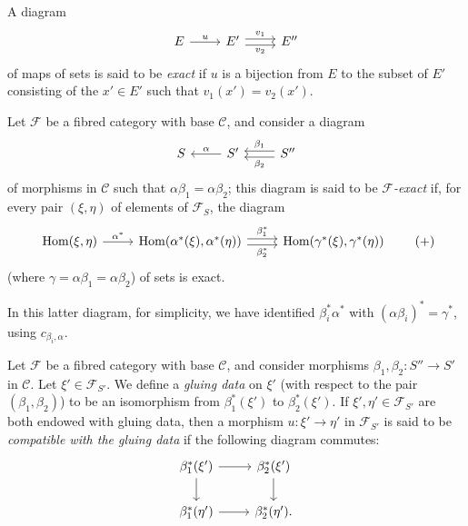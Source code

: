 \documentclass{article}
\theoremstyle{plain}
\theoremstyle{definition}
\newenvironment{definition}[1]
  {\renewcommand\theinnercustomdefinition{#1}\innercustomdefinition}
  {\endinnercustomdefinition}
\newcommand{\sh}[1]{{\mathscr{#1}}}
\newcommand{\cat}[1]{{\mathcal{#1}}}
\DeclareMathOperator{\Hom}{Hom}
\begin{document}
\subsubsection{}
\label{A.1.b}

\begin{definition}{1.2}
\label{definition:A.1.2}
  A diagram
  \[
    \begin{tikzcd}
      E \rar["u"]
      & E' \rar[shift left=1,"v_1"] \rar[shift right=1,swap,"v_2"]
      & E''
    \end{tikzcd}
  \]
  of maps of sets is said to be \emph{exact} if $u$ is a bijection from $E$ to the subset of $E'$ consisting of the $x'\in E'$ such that $v_1(x')=v_2(x')$.
\end{definition}

\begin{definition}{1.3}
\label{definition:A.1.3}
  Let $\sh{F}$ be a fibred category with base $\cat{C}$, and consider a diagram
  \[
    \begin{tikzcd}
      S
      & S' \lar[swap,"\alpha"]
      & S'' \lar[shift right=1,swap,"\beta_1"] \lar[shift left=1,"\beta_2"]
    \end{tikzcd}
  \]
  of morphisms in $\cat{C}$ such that $\alpha\beta_1=\alpha\beta_2$;
  this diagram is said to be \emph{$\sh{F}$-exact} if, for every pair $(\xi,\eta)$ of elements of $\sh{F}_S$, the diagram
  \[
  \label{equation-definition:A.1.3}
    \begin{tikzcd}
      \Hom(\xi,\eta) \rar["\alpha^*"]
      & \Hom(\alpha^*(\xi),\alpha^*(\eta)) \rar[shift left=1,"\beta_1^*"] \rar[shift right=1,swap,"\beta_2^*"]
      & \Hom(\gamma^*(\xi),\gamma^*(\eta))
    \end{tikzcd}
  \tag{+}
  \]
  (where $\gamma=\alpha\beta_1=\alpha\beta_2$) of sets is exact.

  In this latter diagram, for simplicity, we have identified $\beta_i^*\alpha^*$ with $(\alpha\beta_i)^*=\gamma^*$, using $c_{\beta_i,\alpha}$.
\end{definition}

\begin{definition}{1.4}
  Let $\sh{F}$ be a fibred category with base $\cat{C}$, and consider morphisms $\beta_1,\beta_2\colon S''\to S'$ in $\cat{C}$.
  Let $\xi'\in\sh{F}_{S'}$.
  We define a \emph{gluing data} on $\xi'$ (with respect to the pair $(\beta_1,\beta_2)$) to be an isomorphism from $\beta_1^*(\xi')$ to $\beta_2^*(\xi')$.
  If $\xi',\eta'\in\sh{F}_{S'}$ are both endowed with gluing data, then a morphism $u\colon\xi'\to\eta'$ in $\sh{F}_{S'}$ is said to be \emph{compatible with the gluing data} if the following diagram commutes:
  \[
    \begin{tikzcd}
      \beta_1^*(\xi') \rar \dar
      &\beta_2^*(\xi') \dar
    \\\beta_1^*(\eta') \rar
      &\beta_2^*(\eta').
    \end{tikzcd}
  \]
\end{definition}
\end{document}

